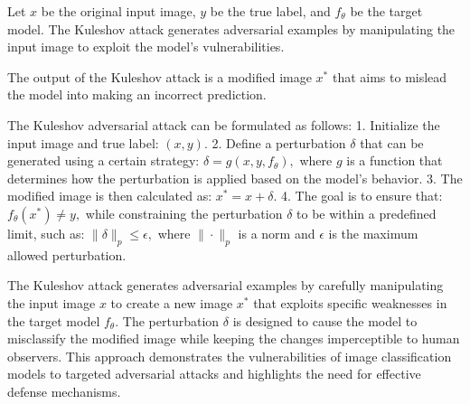 Let \( x \) be the original input image, \( y \) be the true label, and \( f_{\theta} \) be the target model. The Kuleshov attack generates adversarial examples by manipulating the input image to exploit the model's vulnerabilities.

The output of the Kuleshov attack is a modified image \( x^* \) that aims to mislead the model into making an incorrect prediction.

The Kuleshov adversarial attack can be formulated as follows:
1. Initialize the input image and true label:
   $
   (x, y).
   $
2. Define a perturbation \( \delta \) that can be generated using a certain strategy:
   $
   \delta = g(x, y, f_{\theta}),
   $
   where \( g \) is a function that determines how the perturbation is applied based on the model's behavior.
3. The modified image is then calculated as:
   $
   x^* = x + \delta.
   $
4. The goal is to ensure that:
   $
   f_{\theta}(x^*) \neq y,
   $
   while constraining the perturbation \( \delta \) to be within a predefined limit, such as:
   $
   \|\delta\|_p \leq \epsilon,
   $
   where \( \|\cdot\|_p \) is a norm and \( \epsilon \) is the maximum allowed perturbation.

The Kuleshov attack generates adversarial examples by carefully manipulating the input image \( x \) to create a new image \( x^* \) that exploits specific weaknesses in the target model \( f_{\theta} \). The perturbation \( \delta \) is designed to cause the model to misclassify the modified image while keeping the changes imperceptible to human observers. This approach demonstrates the vulnerabilities of image classification models to targeted adversarial attacks and highlights the need for effective defense mechanisms.
